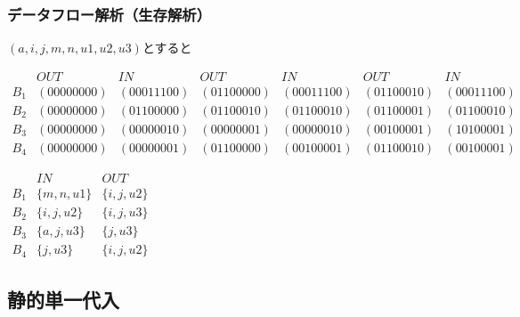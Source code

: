 \documentclass[dvipdfmx]{beamer}
\begin{document}
\begin{frame}
  \frametitle{データフロー解析（生存解析）}
  $(a,i,j,m,n,u1,u2,u3)$とすると

  {\scriptsize
  $\begin{array}{l|llllll}
     & OUT & IN & OUT & IN & OUT & IN\\\hline
  B_1 & (00000000) & (00011100) & (01100000) & (00011100) & (01100010) & (00011100)\\
  B_2 & (00000000) & (01100000) & (01100010) & (01100010) & (01100001) & (01100010)\\
  B_3 & (00000000) & (00000010) & (00000001) & (00000010) & (00100001) & (10100001)\\
  B_4 & (00000000) & (00000001) & (01100000) & (00100001) & (01100010) & (00100001)
  \end{array}$}

  \vspace*{10pt}


  \vspace*{10pt}

  $\begin{array}{l|ll}
    & IN & OUT\\\hline
    B_1 & \{m,n,u1\} & \{i,j,u2\}\\
    B_2 & \{i,j,u2\} & \{i,j,u3\}\\
    B_3 & \{a,j,u3\} & \{j,u3\}\\
    B_4 & \{j,u3\} & \{i,j,u2\}
  \end{array}$
\end{frame}

\subsection{静的単一代入}
\end{document}
